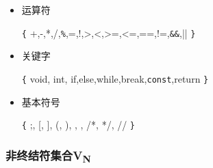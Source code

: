 \documentclass[UTF8,a4paper,10pt]{ctexart}
\begin{document}
\begin{itemize}
\begin{center}
octal\_const\xrightarrow{}0|octal\_const ~ octal\_const

\begin{equation*}
\begin{aligned}
        hex\_const\xrightarrow{}&hex\_prefix ~ hex\_gigit\\
                                &|hex\_const ~ hex\_digit
\end{aligned}
\end{equation*}
hex\_prefix\xrightarrow{} ~ '0x'|'0X'\\
nonzero\_digit\xrightarrow{}1|2|3|4|5|6|7|8|9\\
octal\_dugit\xrightarrow{}0|1|2|3|4|5|6|7\\
\begin{equation*}
\begin{aligned}
        hex\_digit\xrightarrow{}&0|1|2|3|4|5|6|7|8\\
                             &|9|a|b|c|d|e|f\\
                             &|A|B|C|D|E|F  
\end{aligned}
\end{equation*} 

\end{center}
\item 运算符
\begin{center}
\verb|{| +,-,*,/,\verb|%|,=,!,>,<,>=,<=,==,!=,\verb|&&|,|| \verb|}|
\end{center}

\item 关键字
\begin{center}
\verb|{| void, int, if,else,while,break,\verb|const|,return \verb|}|
\end{center}

\item 基本符号
\begin{center}
\verb|{| ;, [, ], (, ), {, }, /*, */, // \verb|}|
\end{center}

\end{itemize}



\subsubsection{非终结符集合V\textsubscript{N}}
\end{document}

